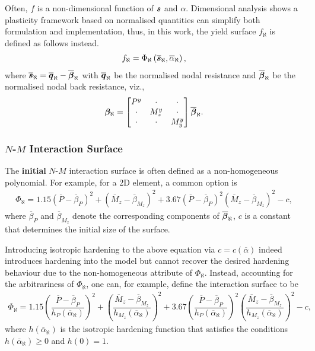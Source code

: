 Often, $f$ is a non-dimensional function of $\bm{s}$ and $\alpha$.
Dimensional analysis shows a plasticity framework based on normalised quantities can simplify both formulation and implementation, thus, in this work, the yield surface $f_\aleph$ is defined as follows instead.
\begin{gather}
f_\aleph=\Phi_\aleph\left(\bm{\overline{s}}_\aleph,\overline{\alpha}_\aleph\right),
\end{gather}
where $\bm{\overline{s}}_\aleph=\bm{\overline{q}}_\aleph-\overline{\bm{\beta}}_\aleph$ with $\bm{\overline{q}}_\aleph$ be the normalised nodal resistance  and $\overline{\bm{\beta}}_\aleph$ be the normalised nodal back resistance, viz.,
\begin{gather}
\bm{\beta}_\aleph=\begin{bmatrix}
P^y&\cdot&\cdot\\\cdot&M_z^y&\cdot\\\cdot&\cdot&M_y^y
\end{bmatrix}\overline{\bm{\beta}}_\aleph.
\end{gather}
\subsubsection{\texorpdfstring{$N$-$M$}{N-M} Interaction Surface}
The \textbf{initial} $N$-$M$ interaction surface is often defined as a non-homogeneous polynomial. For example, for a 2D element, a common option is
\begin{gather}
\Phi_\aleph=1.15\left(\overline{P}-\overline{\beta}_P\right)^2+\left(\overline{M}_z-\overline{\beta}_{M_z}\right)^2+3.67\left(\overline{P}-\overline{\beta}_P\right)^2\left(\overline{M}_z-\overline{\beta}_{M_z}\right)^2-c,
\end{gather}
where $\overline{\beta}_P$ and $\overline{\beta}_{M_z}$ denote the corresponding components of $\overline{\bm{\beta}}_\aleph$, $c$ is a constant that determines the initial size of the surface.

Introducing isotropic hardening to the above equation via $c=c\left(\overline{\alpha}\right)$ indeed introduces hardening into the model but cannot recover the desired hardening behaviour due to the non-homogeneous attribute of $\Phi_\aleph$.
Instead, accounting for the arbitrariness of $\Phi_\aleph$, one can, for example, define the interaction surface to be
\begin{gather}\label{eq:nm_surface_used}
\Phi_\aleph=
1.15\left(\dfrac{\overline{P}-\overline{\beta}_P}{h_P\left(\overline{\alpha}_\aleph\right)}\right)^2+
\left(\dfrac{\overline{M}_z-\overline{\beta}_{M_z}}{h_{M_z}\left(\overline{\alpha}_\aleph\right)}\right)^2+
3.67\left(\dfrac{\overline{P}-\overline{\beta}_P}{h_P\left(\overline{\alpha}_\aleph\right)}\right)^2\left(\dfrac{\overline{M}_z-\overline{\beta}_{M_z}}{h_{M_z}\left(\overline{\alpha}_\aleph\right)}\right)^2-c,
\end{gather}
where $h\left(\overline{\alpha}_\aleph\right)$ is the isotropic hardening function that satisfies the conditions $h\left(\overline{\alpha}_\aleph\right)\geqslant0$ and $h\left(0\right)=1$.

